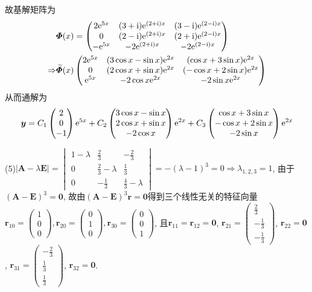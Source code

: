 \begin{solve}
故基解矩阵为
\[\begin{split}
&\bm{\varPhi}(x)=\begin{pmatrix}2\mathrm{e}^{5x}&(3+\mathrm{i})\mathrm{e}^{(2+\mathrm{i})x}&(3-\mathrm{i})\mathrm{e}^{(2-\mathrm{i})x}\\0&(2-\mathrm{i})\mathrm{e}^{(2+\mathrm{i})x}&(2+\mathrm{i})\mathrm{e}^{(2-\mathrm{i})x}\\-\mathrm{e}^{5x}&-2\mathrm{e}^{(2+\mathrm{i})x}&-2\mathrm{e}^{(2-\mathrm{i})x}\end{pmatrix}\\
\Rightarrow&\widetilde{\bm{\varPhi}}(x)\begin{pmatrix}2\mathrm{e}^{5x}&(3\cos x-\sin x)\mathrm{e}^{2x}&(\cos x+3\sin x)\mathrm{e}^{2x}\\0&(2\cos x+\sin x)\mathrm{e}^{2x}&(-\cos x+2\sin x)\mathrm{e}^{2x}\\\mathrm{e}^{5x}&-2\cos x\mathrm{e}^{2x}&-2\sin x\mathrm{e}^{2x}\end{pmatrix}
\end{split}\]
从而通解为
\[\bm{y}=C_1\begin{pmatrix}2\\0\\-1\end{pmatrix}\mathrm{e}^{5x}+C_2\begin{pmatrix}3\cos x-\sin x\\2\cos x+\sin x\\-2\cos x\end{pmatrix}\mathrm{e}^{2x}+C_3\begin{pmatrix}\cos x+3\sin x\\-\cos x+2\sin x\\-2\sin x\end{pmatrix}\mathrm{e}^{2x}\]

(5)$|\bm{A}-\lambda\bm{E}|=\begin{vmatrix}1-\lambda&\frac{2}{3}&-\frac{2}{3}\\0&\frac{2}{3}-\lambda&\frac{1}{3}\\0&-\frac{1}{3}&\frac{4}{3}-\lambda\end{vmatrix}=-(\lambda-1)^3=0\Rightarrow\lambda_{1,2,3}=1$, 
由于$(\bm{A}-\bm{E})^3=\bm{0}$, 
故由$(\bm{A}-\bm{E})^3\bm{r}=\bm{0}$得到三个线性无关的特征向量
$\bm{r}_{10}=\begin{pmatrix}1\\0\\0\end{pmatrix},\bm{r}_{20}=\begin{pmatrix}0\\1\\0\end{pmatrix},\bm{r}_{30}=\begin{pmatrix}0\\0\\1\end{pmatrix}$, 
且$\bm{r}_{11}=\bm{r}_{12}=\bm{0}$, $\bm{r}_{21}=\begin{pmatrix}\frac{2}{3}\\-\frac{1}{3}\\-\frac{1}{3}\end{pmatrix}$,
$\bm{r}_{22}=\bm{0}$, $\bm{r}_{31}=\begin{pmatrix}-\frac{2}{3}\\\frac{1}{3}\\\frac{1}{3}\end{pmatrix}$,
$\bm{r}_{32}=\bm{0}$.


\end{solve}

